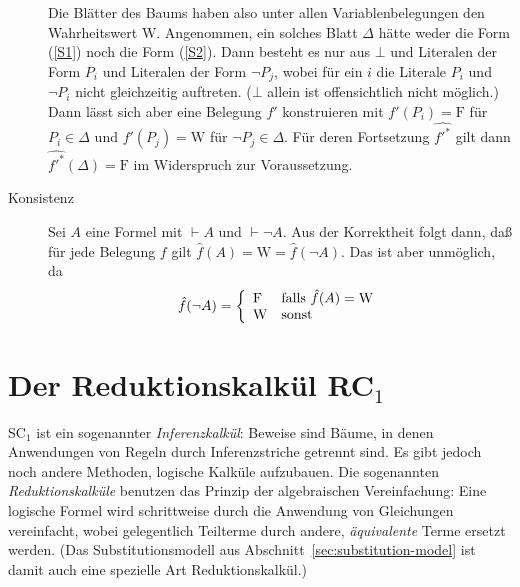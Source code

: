 \begin{beweis}
\begin{description}
    Die Blätter des Baums haben also unter allen Variablenbelegungen den
    Wahrheitswert $\mathrm{W}$.  Angenommen, ein solches Blatt $\Delta$ hätte weder die
    Form (\ref{S1}) noch die Form (\ref{S2}).  Dann besteht es nur aus $\bot$
    und Literalen der Form $P_i$ und Literalen der Form $\neg P_j$, wobei
    für ein $i$ die Literale $P_i$ und $\neg P_i$ nicht gleichzeitig auftreten.
    ($\bot$ allein ist offensichtlich nicht möglich.)  Dann lässt sich aber eine
    Belegung $f'$ konstruieren mit $f'(P_i) = \mathrm{F}$ für
    $P_i\in \Delta$ und $f'(P_j) = \mathrm{W}$ für
    $\neg P_j\in \Delta$.  Für deren Fortsetzung $\widehat{\mbox{$f'$}^*}$ gilt dann
    $\widehat{\mbox{$f'$}^*}(\Delta)=\mathrm{F}$ im Widerspruch zur Voraussetzung.
  \item[Konsistenz] Sei $A$ eine Formel mit $\vdash A$ und $\vdash
    \neg A$.  Aus der Korrektheit folgt dann, daß für jede
    Belegung $f$ gilt ${\hat{f}}(A) = \mathrm{W} =
    {\hat{f}}(\neg A)$.  Das ist aber unmöglich, da 
    \[{\hat{f}}(\neg A)
    = \left\{\begin{array}{ll}
        \mathrm{F} & \mbox{\rm falls\ }{\hat{f}}(A)=\mathrm{W}\\
        \mathrm{W} & \mbox{\rm sonst}
      \end{array}\right.\]
    \end{description}
\end{beweis}
  

\section{Der Reduktionskalkül RC$_1$}
\label{sec:rc1}

SC$_1$ ist ein sogenannter \textit{Inferenzkalkül}: Beweise sind Bäume, in
denen Anwendungen von Regeln durch Inferenzstriche getrennt sind.  Es gibt
jedoch noch andere Methoden, logische Kalküle aufzubauen.  Die sogenannten
\textit{Reduktionskalküle} benutzen das Prinzip der algebraischen
Vereinfachung: Eine logische Formel wird schrittweise durch die Anwendung von
Gleichungen vereinfacht, wobei gelegentlich Teilterme durch andere, 
\emph{äquivalente} Terme ersetzt werden.  %
(Das Substitutionsmodell aus Abschnitt~\ref{sec:substitution-model}
ist damit auch eine spezielle Art Reduktionskalkül.)

